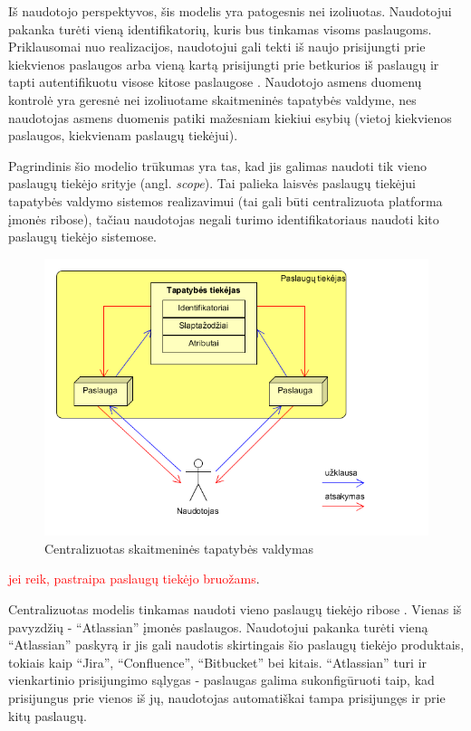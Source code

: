 Iš naudotojo perspektyvos, šis modelis yra patogesnis nei izoliuotas. Naudotojui pakanka turėti vieną identifikatorių,
kuris bus tinkamas visoms paslaugoms. Priklausomai nuo realizacijos, naudotojui gali tekti iš naujo prisijungti prie kiekvienos
paslaugos arba vieną kartą prisijungti prie betkurios iš paslaugų ir tapti autentifikuotu visose kitose paslaugose \cite{Josang2005}. Naudotojo asmens
duomenų kontrolė yra geresnė nei izoliuotame skaitmeninės tapatybės valdyme, nes naudotojas asmens duomenis patiki mažesniam kiekiui esybių
(vietoj kiekvienos paslaugos, kiekvienam paslaugų tiekėjui).

Pagrindinis šio modelio trūkumas yra tas, kad jis galimas naudoti tik vieno paslaugų tiekėjo srityje (angl. \textit{scope}). Tai palieka laisvės paslaugų tiekėjui tapatybės valdymo sistemos
realizavimui (tai gali būti centralizuota platforma įmonės ribose), tačiau naudotojas negali turimo identifikatoriaus
naudoti kito paslaugų tiekėjo sistemose.

\begin{figure}[H]
    \centering
    \includegraphics[scale=0.8]{img/centralizedModel}
    \caption{Centralizuotas skaitmeninės tapatybės valdymas \cite{Cao2010}}
    \label{fig:isolatedModel}
\end{figure}

\textcolor{red}{jei reik, pastraipa paslaugų tiekėjo bruožams}.


Centralizuotas modelis tinkamas naudoti vieno paslaugų tiekėjo ribose \cite{Josang2005}. Vienas iš pavyzdžių - 
\enquote{Atlassian} įmonės paslaugos. Naudotojui pakanka turėti vieną \enquote{Atlassian} paskyrą ir jis gali naudotis
skirtingais šio paslaugų tiekėjo produktais, tokiais kaip \enquote{Jira}, \enquote{Confluence}, \enquote{Bitbucket} bei kitais. \enquote{Atlassian}
turi ir vienkartinio prisijungimo sąlygas - paslaugas galima sukonfigūruoti taip, kad prisijungus prie vienos iš jų,
naudotojas automatiškai tampa prisijungęs ir prie kitų paslaugų.

